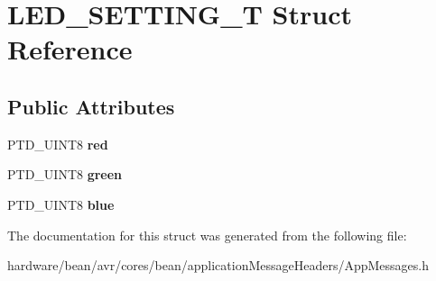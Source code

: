 \hypertarget{struct_l_e_d___s_e_t_t_i_n_g___t}{}\section{L\+E\+D\+\_\+\+S\+E\+T\+T\+I\+N\+G\+\_\+\+T Struct Reference}
\label{struct_l_e_d___s_e_t_t_i_n_g___t}
\subsection*{Public Attributes}
\begin{DoxyCompactItemize}
\item 
\hypertarget{struct_l_e_d___s_e_t_t_i_n_g___t_a4af1cfe5d52b72803f31f1aefeba4dad}{}P\+T\+D\+\_\+\+U\+I\+N\+T8 {\bfseries red}\label{struct_l_e_d___s_e_t_t_i_n_g___t_a4af1cfe5d52b72803f31f1aefeba4dad}

\item 
\hypertarget{struct_l_e_d___s_e_t_t_i_n_g___t_ab6d80e7108e2a40f38db65ed7d068284}{}P\+T\+D\+\_\+\+U\+I\+N\+T8 {\bfseries green}\label{struct_l_e_d___s_e_t_t_i_n_g___t_ab6d80e7108e2a40f38db65ed7d068284}

\item 
\hypertarget{struct_l_e_d___s_e_t_t_i_n_g___t_a453318108cb8ffe685e852435db2e48d}{}P\+T\+D\+\_\+\+U\+I\+N\+T8 {\bfseries blue}\label{struct_l_e_d___s_e_t_t_i_n_g___t_a453318108cb8ffe685e852435db2e48d}

\end{DoxyCompactItemize}


The documentation for this struct was generated from the following file\+:\begin{DoxyCompactItemize}
\item 
hardware/bean/avr/cores/bean/application\+Message\+Headers/App\+Messages.\+h\end{DoxyCompactItemize}
